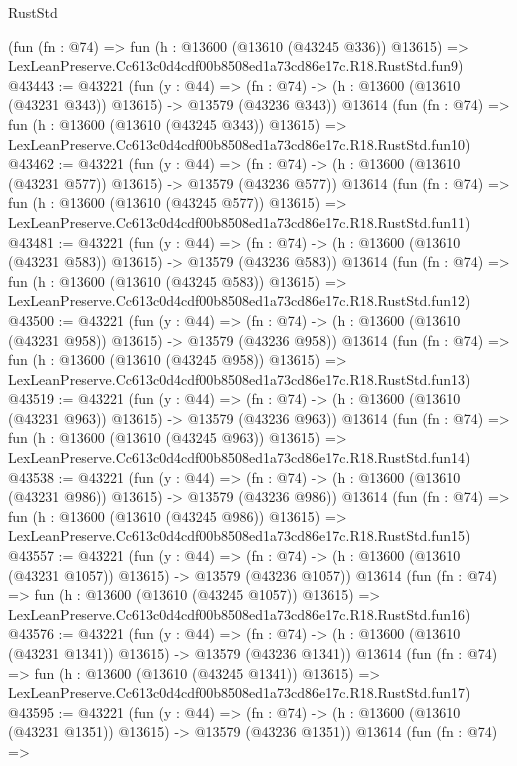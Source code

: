 \begin{lexlean}{RustStd}
\begin{coremodule}
    (fun (fn : @74) =>
    fun (h : @13600 (@13610 (@43245 @336)) @13615) =>
    LexLeanPreserve.Cc613c0d4cdf00b8508ed1a73cd86e17c.R18.RustStd.fun9)
@43443 := @43221
    (fun (y : @44) =>
    (fn : @74) -> (h : @13600 (@13610 (@43231 @343)) @13615) -> @13579 (@43236 @343))
    @13614
    (fun (fn : @74) =>
    fun (h : @13600 (@13610 (@43245 @343)) @13615) =>
    LexLeanPreserve.Cc613c0d4cdf00b8508ed1a73cd86e17c.R18.RustStd.fun10)
@43462 := @43221
    (fun (y : @44) =>
    (fn : @74) -> (h : @13600 (@13610 (@43231 @577)) @13615) -> @13579 (@43236 @577))
    @13614
    (fun (fn : @74) =>
    fun (h : @13600 (@13610 (@43245 @577)) @13615) =>
    LexLeanPreserve.Cc613c0d4cdf00b8508ed1a73cd86e17c.R18.RustStd.fun11)
@43481 := @43221
    (fun (y : @44) =>
    (fn : @74) -> (h : @13600 (@13610 (@43231 @583)) @13615) -> @13579 (@43236 @583))
    @13614
    (fun (fn : @74) =>
    fun (h : @13600 (@13610 (@43245 @583)) @13615) =>
    LexLeanPreserve.Cc613c0d4cdf00b8508ed1a73cd86e17c.R18.RustStd.fun12)
@43500 := @43221
    (fun (y : @44) =>
    (fn : @74) -> (h : @13600 (@13610 (@43231 @958)) @13615) -> @13579 (@43236 @958))
    @13614
    (fun (fn : @74) =>
    fun (h : @13600 (@13610 (@43245 @958)) @13615) =>
    LexLeanPreserve.Cc613c0d4cdf00b8508ed1a73cd86e17c.R18.RustStd.fun13)
@43519 := @43221
    (fun (y : @44) =>
    (fn : @74) -> (h : @13600 (@13610 (@43231 @963)) @13615) -> @13579 (@43236 @963))
    @13614
    (fun (fn : @74) =>
    fun (h : @13600 (@13610 (@43245 @963)) @13615) =>
    LexLeanPreserve.Cc613c0d4cdf00b8508ed1a73cd86e17c.R18.RustStd.fun14)
@43538 := @43221
    (fun (y : @44) =>
    (fn : @74) -> (h : @13600 (@13610 (@43231 @986)) @13615) -> @13579 (@43236 @986))
    @13614
    (fun (fn : @74) =>
    fun (h : @13600 (@13610 (@43245 @986)) @13615) =>
    LexLeanPreserve.Cc613c0d4cdf00b8508ed1a73cd86e17c.R18.RustStd.fun15)
@43557 := @43221
    (fun (y : @44) =>
    (fn : @74) -> (h : @13600 (@13610 (@43231 @1057)) @13615) -> @13579 (@43236 @1057))
    @13614
    (fun (fn : @74) =>
    fun (h : @13600 (@13610 (@43245 @1057)) @13615) =>
    LexLeanPreserve.Cc613c0d4cdf00b8508ed1a73cd86e17c.R18.RustStd.fun16)
@43576 := @43221
    (fun (y : @44) =>
    (fn : @74) -> (h : @13600 (@13610 (@43231 @1341)) @13615) -> @13579 (@43236 @1341))
    @13614
    (fun (fn : @74) =>
    fun (h : @13600 (@13610 (@43245 @1341)) @13615) =>
    LexLeanPreserve.Cc613c0d4cdf00b8508ed1a73cd86e17c.R18.RustStd.fun17)
@43595 := @43221
    (fun (y : @44) =>
    (fn : @74) -> (h : @13600 (@13610 (@43231 @1351)) @13615) -> @13579 (@43236 @1351))
    @13614
    (fun (fn : @74) =>

\end{coremodule}
\end{lexlean}

